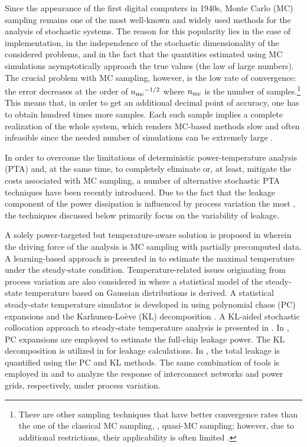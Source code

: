 Since the appearance of the first digital computers in 1940s, Monte Carlo (MC) sampling remains one of the most well-known and widely used methods for the analysis of stochastic systems.
The reason for this popularity lies in the ease of implementation, in the independence of the stochastic dimensionality of the considered problems, and in the fact that the quantities estimated using MC simulations asymptotically approach the true values (the law of large numbers).
The crucial problem with MC sampling, however, is the low rate of convergence: the error decreases at the order of ${n_\text{mc}}^{-1/2}$ where ${n_\text{mc}}$ is the number of samples.\footnote{There are other sampling techniques that have better convergence rates than the one of the classical MC sampling, \eg, quasi-MC sampling; however, due to additional restrictions, their applicability is often limited \cite{xiu2010}.}
This means that, in order to get an additional decimal point of accuracy, one has to obtain hundred times more samples.
Each such sample implies a complete realization of the whole system, which renders MC-based methods slow and often infeasible since the needed number of simulations can be extremely large \cite{diaz-emparanza2002}.

In order to overcome the limitations of deterministic power-temperature analysis (PTA) and, at the same time, to completely eliminate or, at least, mitigate the costs associated with MC sampling, a number of alternative stochastic PTA techniques have been recently introduced.
Due to the fact that the leakage component of the power dissipation is influenced by process variation the most \cite{chandrakasan2001, srivastava2010, juan2011, juan2012}, the techniques discussed below primarily focus on the variability of leakage.

A solely power-targeted but temperature-aware solution is proposed in \cite{chandra2010} wherein the driving force of the analysis is MC sampling with partially precomputed data.
A learning-based approach is presented in \cite{juan2011} to estimate the maximal temperature under the steady-state condition.
Temperature-related issues originating from process variation are also considered in \cite{juan2012} where a statistical model of the steady-state temperature based on Gaussian distributions is derived.
A statistical steady-state temperature simulator is developed in \cite{huang2009} using polynomial chaos (PC) expansions and the Karhunen-Lo\`{e}ve (KL) decomposition \cite{xiu2010, ghanem1991}.
A KL-aided stochastic collocation \cite{xiu2010} approach to steady-state temperature analysis is presented in \cite{lee2013}.
In \cite{shen2009}, PC expansions are employed to estimate the full-chip leakage power.
The KL decomposition is utilized in \cite{bhardwaj2006} for leakage calculations.
In \cite{bhardwaj2008}, the total leakage is quantified using the PC and KL methods.
The same combination of tools is employed in \cite{vrudhula2006} and \cite{ghanta2006} to analyze the response of interconnect networks and power grids, respectively, under process variation.

